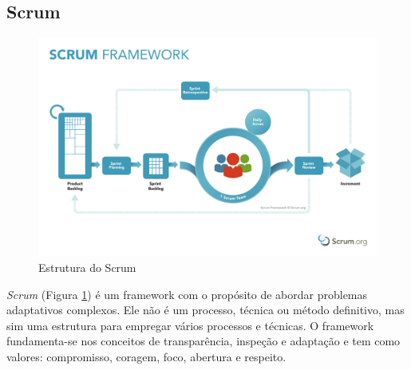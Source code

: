 \subsection{Scrum}
\begin{figure}[h]
    \centering
    \includegraphics[width=\textwidth]{pfc/figuras/scrum.pdf}
    \caption{Estrutura do Scrum}
    \label{fig:scrum}
\end{figure}

\textit{Scrum} (Figura \ref{fig:scrum}) \cite{scrum-guide} é um framework com o propósito de abordar problemas adaptativos complexos. Ele não é um processo, técnica ou método definitivo, mas sim uma estrutura para empregar vários processos e técnicas. O framework fundamenta-se nos conceitos de transparência, inspeção e adaptação e tem como valores: compromisso, coragem, foco, abertura e respeito.


